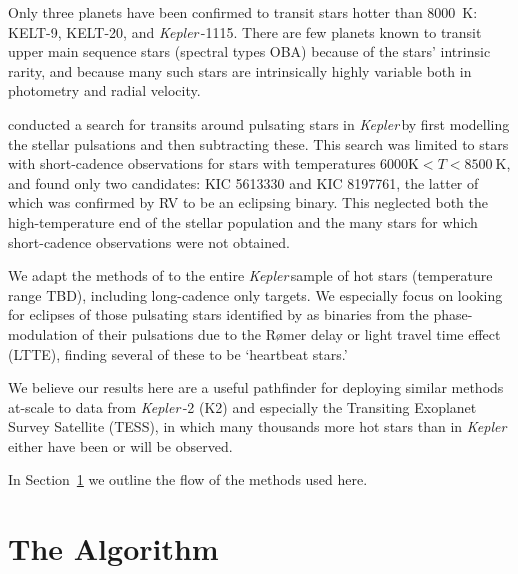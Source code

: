 \documentclass{aastex62}
\newcommand\kepler{\emph{Kepler}\,}
\begin{document}
Only three planets have been confirmed to transit stars hotter than 8000~K: KELT-9, KELT-20, and \kepler-1115. There are few planets known to transit upper main sequence stars (spectral types OBA) because of the stars' intrinsic rarity, and because many such stars are intrinsically highly variable both in photometry and radial velocity.

\citet{sowicka2017} conducted a search for transits around pulsating stars in \kepler by first modelling the stellar pulsations and then subtracting these. 
This search was limited to stars with short-cadence observations for stars with temperatures $6000 \text{K} < T < 8500~\text{K}$, and found only two candidates: KIC 5613330 and KIC 8197761, the latter of which was confirmed by RV to be an eclipsing binary. This neglected both the high-temperature end of the stellar population and the many stars for which short-cadence observations were not obtained.

We adapt the methods of \citet{sowicka2017} to the entire \kepler sample of hot stars (temperature range TBD), including long-cadence only targets. We especially focus on looking for eclipses of those pulsating stars identified by \citet{murphy2018} as binaries from the phase-modulation of their pulsations due to the R\o mer delay or light travel time effect (LTTE), finding several of these to be `heartbeat stars.'

We believe our results here are a useful pathfinder for deploying similar methods at-scale to data from \kepler-2 (K2) and especially the Transiting Exoplanet Survey Satellite (TESS), in which many thousands more hot stars than in \kepler either have been or will be observed.

In Section~\ref{algorithm} we outline the flow of the methods used here.

\newpage

\section{The Algorithm}
\label{algorithm}
\end{document}
